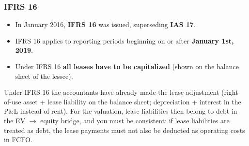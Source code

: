 \subsubsection*{IFRS 16}
\begin{itemize}
  \item In January 2016, \textbf{IFRS 16} was issued, superseding \textbf{IAS 17}.
  \item IFRS 16 applies to reporting periods beginning on or after \textbf{January 1st, 2019}.
  \item Under IFRS 16 \textbf{all leases have to be capitalized} (shown on the balance sheet of the lessee).
\end{itemize}

\begin{center}
\end{center}

\begin{addbox}
Under IFRS 16 the accountants have already made the lease adjustment (right-of-use asset + lease liability on the balance sheet; depreciation + interest in the P\&L instead of rent). For the valuation, lease liabilities then belong to debt in the EV $\to$ equity bridge, and you must be consistent: if lease liabilities are treated as debt, the lease payments must not also be deducted as operating costs in FCFO.
\end{addbox}

